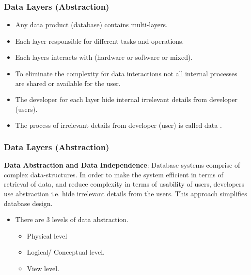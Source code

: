 \begin{frame}
	\frametitle{Data Layers (Abstraction)}
		\begin{itemize}[<+->]
			\item Any data product (database) contains multi-layers.
			\item Each layer responsible for different tasks and operations.
			\item Each layers interacts with (hardware or software or mixed).
			\item To eliminate the complexity for data interactions not all internal processes are shared or available for the user.
			\item The developer for each layer hide internal irrelevant details from developer (users). 
			\item The process of \textbf{\underline{}} irrelevant details from developer (user) is called data \textbf{\underline{}}.
		\end{itemize}	
\end{frame}
\begin{frame}
	\frametitle{Data Layers (Abstraction)}
\begin{definition}
	\textbf{Data Abstraction and Data Independence}: Database systems comprise of complex data-structures. In order to make the system efficient in terms of retrieval of data, and reduce complexity in terms of usability of users, developers use abstraction i.e. hide irrelevant details from the users. This approach simplifies database design.
\end{definition}	
	\begin{itemize}[<+->]
		\item There are 3 levels of data abstraction.
		\begin{itemize}[<+->]
			\item Physical level
			\item Logical/ Conceptual level.
			\item View level.
		\end{itemize}
	\end{itemize}	

\end{frame}

